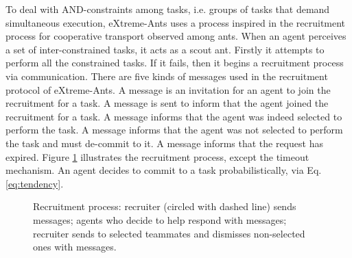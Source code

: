 To deal with AND-constraints among tasks, i.e. groups of tasks that demand simultaneous execution, eXtreme-Ants uses a process inspired in the recruitment process for cooperative transport observed among ants. When an agent perceives a set of inter-constrained tasks, it acts as a scout ant. Firstly it attempts to perform all the constrained tasks. If it fails, then it begins a recruitment process via communication. There are five kinds of messages used in the recruitment protocol of eXtreme-Ants. A  message is an invitation for an agent to join the recruitment for a task. A  message is sent to inform  that the agent joined the recruitment for a task. A  message informs that the agent was indeed selected to perform the task. A  message informs that the agent was not selected to perform the task and must de-commit to it. A  message informs that the request has expired. Figure \ref{fig:auction} illustrates the recruitment process, except the timeout mechanism. An agent decides to commit to a task probabilistically, via Eq. \ref{eq:tendency}. 

\begin{figure}[ht]
  \centering

  \caption{Recruitment process:  recruiter (circled with dashed line) sends  messages;  agents who decide to help respond with  messages;  recruiter sends  to selected teammates and dismisses non-selected ones with  messages.}

 \label{fig:auction}
\end{figure}

